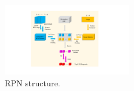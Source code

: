 \documentclass[letterpaper, 10 pt, conference]{ieeeconf}  %
\begin{document}


\begin{figure}
	\vspace{-0.6cm}
	\rule{0pt}{1ex}
	\begin{center}
		\includegraphics[trim={7.5cm, 2cm, 8.5cm, 2cm}, clip,width=0.5\textwidth]{images/rpn.pdf}
	\end{center}
	\caption{RPN structure.}
	\label{fig:rpn}
	\vspace{-0.5cm}
\end{figure}
\end{document}
